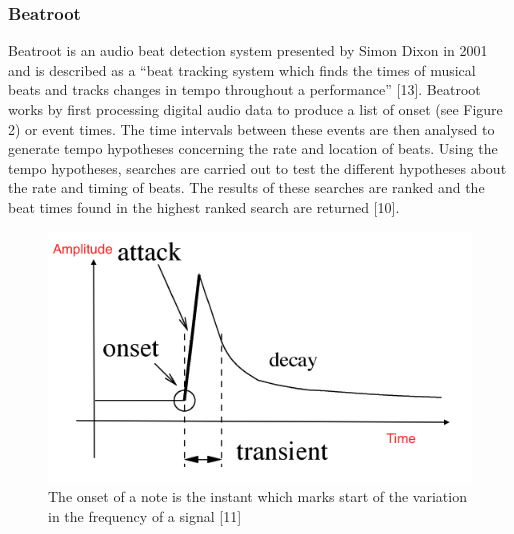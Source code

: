 \documentclass[a4paper, 11pt]{article}
\begin{document}
\subsubsection{Beatroot}
Beatroot is an audio beat detection system presented by Simon Dixon in 2001 and is described as a ``beat tracking system which finds the times of musical beats and tracks changes in tempo throughout a performance'' [13]. Beatroot works by first processing digital audio data to produce a list of onset (see Figure 2) or event times. The time intervals between these events are then analysed to generate tempo hypotheses concerning the rate and location of beats. Using the tempo hypotheses, searches are carried out to test the different hypotheses about the rate and timing of beats. The results of these searches are ranked and the beat times found in the highest ranked search are returned [10]. 


\begin{figure}[h]
	\centering
	\includegraphics[scale=0.40]{Onset}
	\caption{The onset of a note is the instant which marks start of the variation in the frequency of a signal [11]}
\end{figure}
\end{document}
